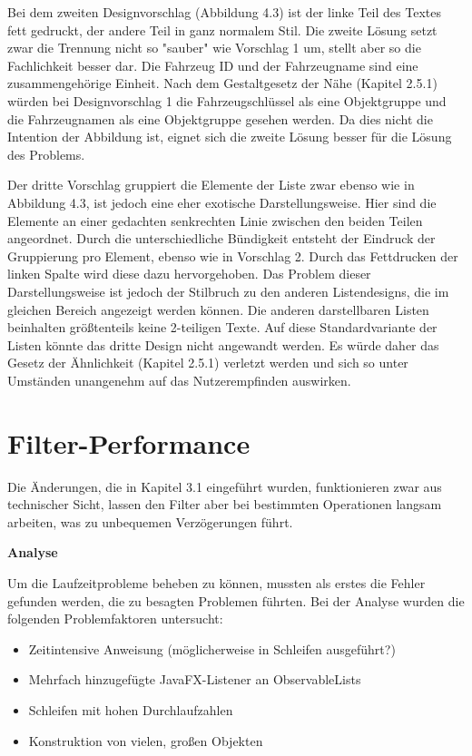 Bei dem zweiten Designvorschlag (Abbildung 4.3) ist der linke Teil des Textes fett gedruckt, der andere Teil in ganz normalem Stil. Die zweite Lösung setzt zwar die Trennung nicht so "sauber" wie Vorschlag 1 um, stellt aber so die Fachlichkeit besser dar. Die Fahrzeug ID und der Fahrzeugname sind eine zusammengehörige Einheit. Nach dem Gestaltgesetz der Nähe (Kapitel 2.5.1) würden bei Designvorschlag 1 die Fahrzeugschlüssel als eine Objektgruppe und die Fahrzeugnamen als eine Objektgruppe gesehen werden. Da dies nicht die Intention der Abbildung ist, eignet sich die zweite Lösung besser für die Lösung des Problems.

Der dritte Vorschlag gruppiert die Elemente der Liste zwar ebenso wie in Abbildung 4.3, ist jedoch eine eher exotische Darstellungsweise. Hier sind die Elemente an einer gedachten senkrechten Linie zwischen den beiden Teilen angeordnet. Durch die unterschiedliche Bündigkeit entsteht der Eindruck der Gruppierung pro Element, ebenso wie in Vorschlag 2. Durch das Fettdrucken der linken Spalte wird diese dazu hervorgehoben. Das Problem dieser Darstellungsweise ist jedoch der Stilbruch zu den anderen Listendesigns, die im gleichen Bereich angezeigt werden können. Die anderen darstellbaren Listen beinhalten größtenteils keine 2-teiligen Texte. Auf diese Standardvariante der Listen könnte das dritte Design nicht angewandt werden. Es würde daher das Gesetz der Ähnlichkeit (Kapitel 2.5.1) verletzt werden und sich so unter Umständen unangenehm auf das Nutzerempfinden auswirken.
\section{Filter-Performance} \label{sec:analyseFilterPerformance}
Die Änderungen, die in Kapitel 3.1 eingeführt wurden, funktionieren zwar aus technischer Sicht, lassen den Filter aber bei bestimmten Operationen langsam arbeiten, was zu unbequemen Verzögerungen führt.

\textbf{Analyse}

Um die Laufzeitprobleme beheben zu können, mussten als erstes die Fehler gefunden werden, die zu besagten Problemen führten. Bei der Analyse wurden die folgenden Problemfaktoren untersucht:

\begin{itemize}
	\item Zeitintensive Anweisung (möglicherweise in Schleifen ausgeführt?)
	\item Mehrfach hinzugefügte JavaFX-Listener an ObservableLists
	\item Schleifen mit hohen Durchlaufzahlen
	\item Konstruktion von vielen, großen Objekten
\end{itemize}

